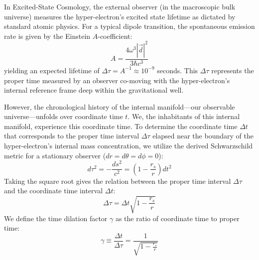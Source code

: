 In Excited-State Cosmology, the external observer (in the macroscopic bulk universe) measures the hyper-electron's excited state lifetime as dictated by standard atomic physics. For a typical dipole transition, the spontaneous emission rate is given by the Einstein $A$-coefficient:
\begin{equation}
A = \frac{4\omega^3 |\vec{d}|^2}{3\hbar c^3}
\end{equation}
yielding an expected lifetime of $\Delta \tau = A^{-1} \approx 10^{-9}$ seconds. This $\Delta \tau$ represents the proper time measured by an observer co-moving with the hyper-electron's internal reference frame deep within the gravitational well.

However, the chronological history of the internal manifold—our observable universe—unfolds over coordinate time $t$. We, the inhabitants of this internal manifold, experience this coordinate time. To determine the coordinate time $\Delta t$ that corresponds to the proper time interval $\Delta \tau$ elapsed near the boundary of the hyper-electron's internal mass concentration, we utilize the derived Schwarzschild metric for a stationary observer ($dr = d\theta = d\phi = 0$):
\begin{equation}
d\tau^2 = - \frac{ds^2}{c^2} = \left(1 - \frac{r_s}{r}\right) dt^2
\end{equation}
Taking the square root gives the relation between the proper time interval $\Delta \tau$ and the coordinate time interval $\Delta t$:
\begin{equation}
\Delta \tau = \Delta t \sqrt{1 - \frac{r_s}{r}}
\end{equation}
We define the time dilation factor $\gamma$ as the ratio of coordinate time to proper time:
\begin{equation}
\gamma \equiv \frac{\Delta t}{\Delta \tau} = \frac{1}{\sqrt{1 - \frac{r_s}{r}}}
\end{equation}

